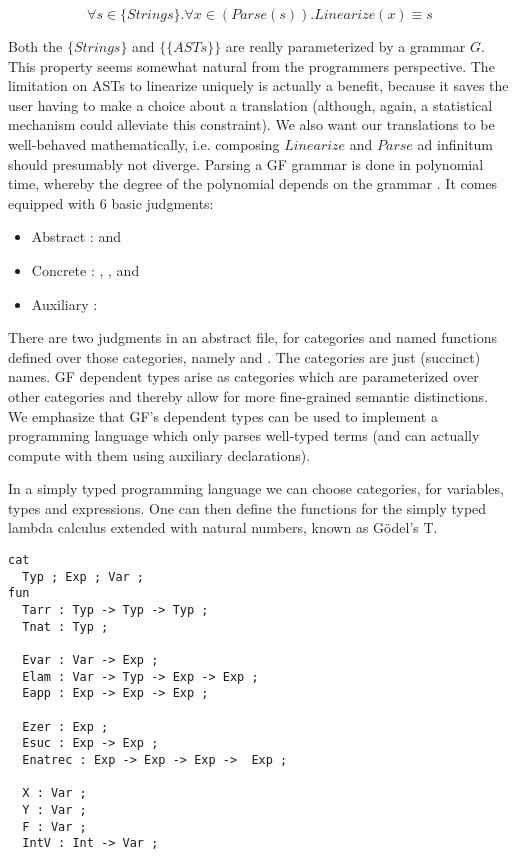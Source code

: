  $$\forall s \in \{Strings\}. \forall x \in (Parse(s)). Linearize(x) \equiv s$$

Both the $\{Strings\}$ and $\{\{ASTs\}\}$ are really parameterized by a grammar
$G$. This property seems somewhat natural from the programmers perspective. The
limitation on ASTs to linearize uniquely is actually a benefit, because it saves
the user having to make a choice about a translation (although, again, a
statistical mechanism could alleviate this constraint). We also want our
translations to be well-behaved mathematically, i.e. composing $Linearize$ and
$Parse$ ad infinitum should presumably not diverge. Parsing a GF grammar is done
in polynomial time, whereby the degree of the polynomial depends on the grammar
\cite{angelov2010phd} . It comes equipped with 6 basic judgments:

\begin{itemize}[noitemsep]
  \item Abstract :  and 
  \item Concrete : , , and 
  \item Auxiliary : 
\end{itemize}

There are two judgments in an abstract file, for categories and named functions
defined over those categories, namely  and . The categories
are just (succinct) names. GF dependent types arise as categories which are
parameterized over other categories and thereby allow for more fine-grained
semantic distinctions. We emphasize that GF's dependent types can be used to
implement a programming language which only parses well-typed terms (and can
actually compute with them using auxiliary declarations).

In a simply typed programming language we can choose categories, for variables,
types and expressions. One can then define the functions for the simply typed
lambda calculus extended with natural numbers, known as Gödel's T.

\begin{verbatim} 
cat
  Typ ; Exp ; Var ;
fun
  Tarr : Typ -> Typ -> Typ ;
  Tnat : Typ ;

  Evar : Var -> Exp ;
  Elam : Var -> Typ -> Exp -> Exp ;
  Eapp : Exp -> Exp -> Exp ;

  Ezer : Exp ;
  Esuc : Exp -> Exp ;
  Enatrec : Exp -> Exp -> Exp ->  Exp ;

  X : Var ;
  Y : Var ;
  F : Var ;
  IntV : Int -> Var ;
\end{verbatim}

